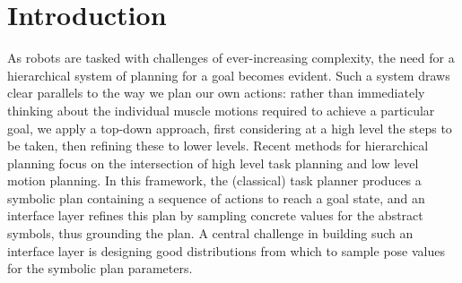 \section{Introduction}
As robots are tasked with challenges of ever-increasing complexity, the need
for a hierarchical system of planning for a goal becomes evident. Such a system
draws clear parallels to the way we plan our own actions: rather than
immediately thinking about the individual muscle motions required to achieve a particular
goal, we apply a top-down approach, first considering at a high level the
steps to be taken, then refining these to lower levels. Recent methods for
hierarchical planning focus on the intersection of high level task planning
and low level motion planning. In this framework, the (classical) task planner produces
a symbolic plan containing a sequence of actions to reach a goal
state, and an interface layer refines this plan by sampling concrete values for
the abstract symbols, thus grounding the plan. A central challenge in building such
an interface layer is designing good distributions from which to sample
pose values for the symbolic plan parameters.

